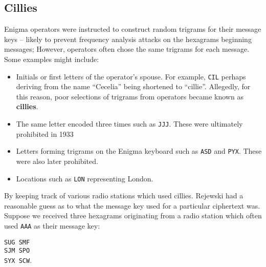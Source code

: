 \subsection{Cillies}\label{section_cillies}
Enigma operators were instructed to construct random trigrams for
their message keys -- likely to prevent frequency analysis attacks on
the hexagrams beginning messages; However, operators often chose the
same trigrams for each message. Some examples might include:
\begin{itemize}
  \item Initials or first letters of the operator's spouse. For
    example, \texttt{CIL} perhaps deriving from the name ``Cecelia''
    being shortened to ``cillie''. Allegedly, for this reason, poor
    selections of trigrams from operators became known as {\bf{cillies}}.
  \item The same letter encoded three times such as \texttt{JJJ}.
    These were ultimately prohibited in 1933
  \item Letters forming trigrams on the Enigma keyboard such as
    \texttt{ASD} and \texttt{PYX}. These were also later prohibited.
  \item Locations such as \texttt{LON} representing London.

\end{itemize}
By keeping track of various radio stations which used cillies.
Rejewski had a reasonable guess as to what the message key used for a
particular ciphertext was. Suppose we received three hexagrams
originating from a radio station which often used \texttt{AAA} as
their message key:
\begin{center}
  \texttt{SUG SMF}\\
  \texttt{SJM SPO}\\
  \texttt{SYX SCW}.
\end{center}

